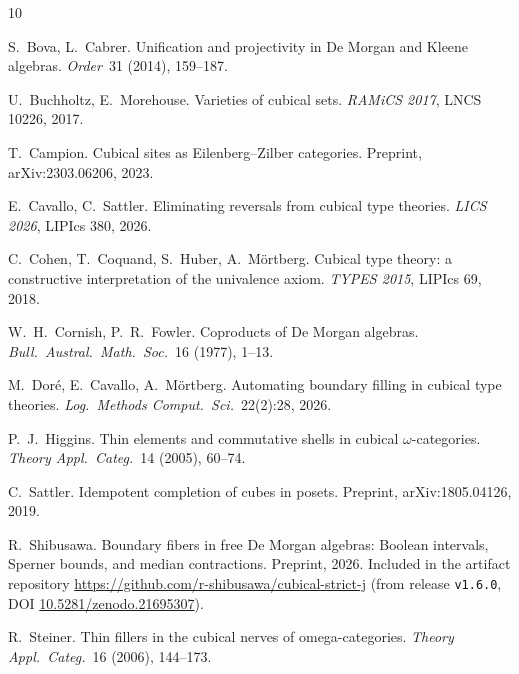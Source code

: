 \documentclass[11pt]{amsart}
\theoremstyle{definition}
\begin{document}
\begin{thebibliography}{10}

S.~Bova, L.~Cabrer.
\newblock Unification and projectivity in De Morgan and Kleene
  algebras.
\newblock \emph{Order}\ 31 (2014), 159--187.

U.~Buchholtz, E.~Morehouse.
\newblock Varieties of cubical sets.
\newblock \emph{RAMiCS 2017}, LNCS 10226, 2017.

T.~Campion.
\newblock Cubical sites as Eilenberg--Zilber categories.
\newblock Preprint, arXiv:2303.06206, 2023.

E.~Cavallo, C.~Sattler.
\newblock Eliminating reversals from cubical type theories.
\newblock \emph{LICS 2026}, LIPIcs 380, 2026.

C.~Cohen, T.~Coquand, S.~Huber, A.~M\"ortberg.
\newblock Cubical type theory: a constructive interpretation of the
  univalence axiom.
\newblock \emph{TYPES 2015}, LIPIcs 69, 2018.

W.~H.~Cornish, P.~R.~Fowler.
\newblock Coproducts of De Morgan algebras.
\newblock \emph{Bull.\ Austral.\ Math.\ Soc.}\ 16 (1977), 1--13.

M.~Dor\'e, E.~Cavallo, A.~M\"ortberg.
\newblock Automating boundary filling in cubical type theories.
\newblock \emph{Log.\ Methods Comput.\ Sci.}\ 22(2):28, 2026.

P.~J.~Higgins.
\newblock Thin elements and commutative shells in cubical
  $\omega$-categories.
\newblock \emph{Theory Appl.\ Categ.}\ 14 (2005), 60--74.

C.~Sattler.
\newblock Idempotent completion of cubes in posets.
\newblock Preprint, arXiv:1805.04126, 2019.

R.~Shibusawa.
\newblock Boundary fibers in free De Morgan algebras: Boolean
  intervals, Sperner bounds, and median contractions.
\newblock Preprint, 2026.  Included in the artifact repository
  \url{https://github.com/r-shibusawa/cubical-strict-j} (from
  release \texttt{v1.6.0}, DOI
  \href{https://doi.org/10.5281/zenodo.21695307}%
  {10.5281/zenodo.21695307}).

R.~Steiner.
\newblock Thin fillers in the cubical nerves of omega-categories.
\newblock \emph{Theory Appl.\ Categ.}\ 16 (2006), 144--173.

\end{thebibliography}
\end{document}
